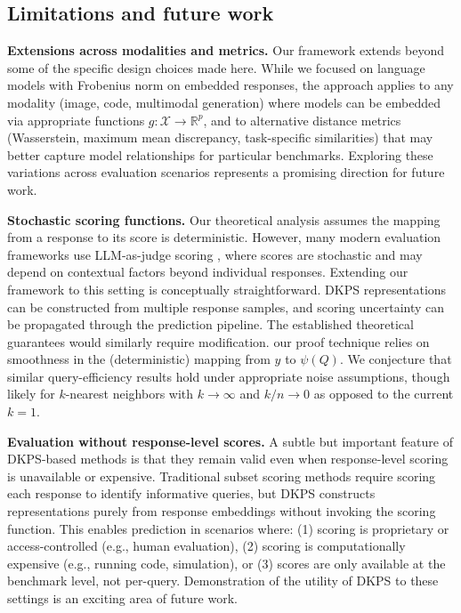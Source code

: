\subsection*{Limitations and future work}
\noindent\textbf{Extensions across modalities and metrics.} Our framework extends beyond some of the specific design choices made here.
While we focused on language models with Frobenius norm on embedded responses, the approach applies to any modality (image, code, multimodal generation) where models can be embedded via appropriate functions $g: \mathcal{X} \to \mathbb{R}^p$, and to alternative distance metrics (Wasserstein, maximum mean discrepancy, task-specific similarities) that may better capture model relationships for particular benchmarks.
Exploring these variations across evaluation scenarios represents a promising direction for future work.

\noindent\textbf{Stochastic scoring functions.}
Our theoretical analysis assumes the mapping from a response to its score is deterministic.
However, many modern evaluation frameworks use LLM-as-judge scoring \citep{zheng2023judging}, where scores are stochastic and may depend on contextual factors beyond individual responses.
Extending our framework to this setting is conceptually straightforward.
DKPS representations can be constructed from multiple response samples, and scoring uncertainty can be propagated through the prediction pipeline.
The established theoretical guarantees would similarly require modification.
our proof technique relies on smoothness in the (deterministic) mapping from $y$ to $\psi(Q)$.
We conjecture that similar query-efficiency results hold under appropriate noise assumptions, though likely for $k$-nearest neighbors with $k \to \infty$ and $k/n \to 0$ as opposed to the current $k = 1$.

\noindent\textbf{Evaluation without response-level scores.}
A subtle but important feature of DKPS-based methods is that they remain valid even when response-level scoring is unavailable or expensive.
Traditional subset scoring methods require scoring each response to identify informative queries, but DKPS constructs representations purely from response embeddings without invoking the scoring function.
This enables prediction in scenarios where: (1) scoring is proprietary or access-controlled (e.g., human evaluation), (2) scoring is computationally expensive (e.g., running code, simulation), or (3) scores are only available at the benchmark level, not per-query.
Demonstration of the utility of DKPS to these settings is an exciting area of future work.

